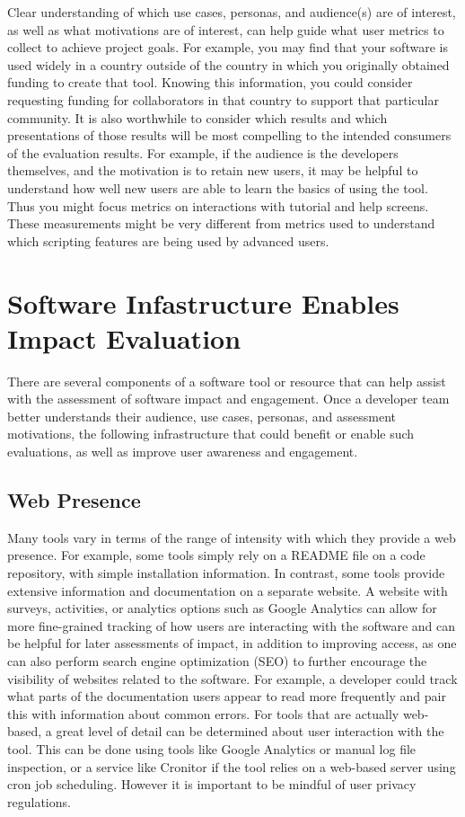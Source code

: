 \documentclass{article}
\begin{document}
Clear understanding of which use cases, personas, and audience(s) are of interest, as well as what motivations are of interest, can help guide what user metrics to collect to achieve project goals. For example, you may find that your software is used widely in a country outside of the country in which you originally obtained funding to create that tool. Knowing this information, you could consider requesting funding for collaborators in that country to support that particular community. It is also worthwhile to consider which results and which presentations of those results will be most compelling to the intended consumers of the evaluation results. For example, if the audience is the developers themselves, and the motivation is to retain new users, it may be helpful to understand how well new users are able to learn the basics of using the tool. Thus you might focus metrics on interactions with tutorial and help screens.  These measurements might be very different from metrics used to understand which scripting features are being used by advanced users. 

\section{Software Infastructure Enables Impact Evaluation}
There are several components of a software tool or resource that can help assist with the assessment of software impact and engagement. Once a developer team better understands their audience, use cases, personas, and assessment motivations, the following infrastructure that could benefit or enable such evaluations, as well as improve user awareness and engagement. 

\subsection{Web Presence}
Many tools vary in terms of the range of intensity with which they provide a web presence. For example, some tools simply rely on a README file on a code repository, with simple installation information. In contrast, some tools provide extensive information and documentation on a separate website. A website with surveys, activities, or analytics options such as Google Analytics can allow for more fine-grained tracking of how users are interacting with the software and can be helpful for later assessments of impact, in addition to improving access, as one can also perform search engine optimization (SEO) to further encourage the visibility of websites related to the software. For example, a developer could track what parts of the documentation users appear to read more frequently and pair this with information about common errors. For tools that are actually web-based, a great level of detail can be determined about user interaction with the tool. This can be done using tools like Google Analytics or manual log file inspection, or a service like Cronitor \cite{cronitor}  if the tool relies on a web-based server using cron \cite{cron_2009} job scheduling. However it is important to be mindful of user privacy regulations.
\end{document}
